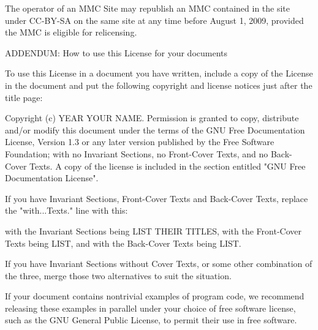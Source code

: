 \documentclass[11pt]{article}
\begin{document}
The operator of an MMC Site may republish an MMC contained in the site
under CC-BY-SA on the same site at any time before August 1, 2009,
provided the MMC is eligible for relicensing.


ADDENDUM: How to use this License for your documents

To use this License in a document you have written, include a copy of
the License in the document and put the following copyright and
license notices just after the title page:

    Copyright (c)  YEAR  YOUR NAME.
    Permission is granted to copy, distribute and/or modify this document
    under the terms of the GNU Free Documentation License, Version 1.3
    or any later version published by the Free Software Foundation;
    with no Invariant Sections, no Front-Cover Texts, and no Back-Cover Texts.
    A copy of the license is included in the section entitled "GNU
    Free Documentation License".

If you have Invariant Sections, Front-Cover Texts and Back-Cover Texts,
replace the "with...Texts." line with this:

    with the Invariant Sections being LIST THEIR TITLES, with the
    Front-Cover Texts being LIST, and with the Back-Cover Texts being LIST.

If you have Invariant Sections without Cover Texts, or some other
combination of the three, merge those two alternatives to suit the
situation.

If your document contains nontrivial examples of program code, we
recommend releasing these examples in parallel under your choice of
free software license, such as the GNU General Public License,
to permit their use in free software.
\end{document}
